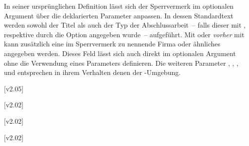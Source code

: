 \begin{DeclareEntity*}{}
\begin{DeclareEntity*}{}
\begin{DeclareEntity*}{}
\begin{Declaration}
\begin{Declaration}
\begin{Declaration}
\begin{Declaration}
\begin{Declaration}
\begin{Declaration}
\begin{Declaration}
In seiner ursprünglichen Definition lässt sich der Sperrvermerk im optionalen 
Argument über die deklarierten Parameter anpassen. In dessen Standardtext 
werden sowohl der Titel als auch der Typ der Abschlussarbeit~-- falls dieser 
mit , 
respektive durch die Option  angegeben wurde~-- aufgeführt. 
Mit  oder \emph{vorher} mit  kann 
zusätzlich eine im Sperrvermerk zu nennende Firma oder ähnliches angegeben 
werden. Dieses Feld lässt sich auch direkt im optionalen Argument ohne die 
Verwendung eines Parameters definieren. Die weiteren Parameter 
, 
, 
, 
 und 
 entsprechen in ihrem Verhalten denen 
der -Umgebung.
\end{Declaration}
\end{Declaration}
\end{Declaration}
\end{Declaration}
\end{Declaration}
\end{Declaration}
\end{Declaration}

\begin{Declaration}
  {}
\begin{Declaration}
  {}
  [v2.05]
\begin{Declaration}
  {}
\begin{Declaration}
  {}
  [v2.02]
\begin{Declaration}
  {}
  [v2.02]
\begin{Declaration}
  {}
  [v2.02]
\begin{Declaration}
  {}
\begin{Declaration}
  {}
\begin{Declaration}
  {}
\begin{Declaration}
  {}
\begin{Declaration}
  {}
\printdeclarationlist


\end{Declaration}
\end{Declaration}
\end{Declaration}
\end{Declaration}
\end{Declaration}
\end{Declaration}
\end{Declaration}
\end{Declaration}
\end{Declaration}
\end{Declaration}
\end{Declaration}
\end{DeclareEntity*}
\end{DeclareEntity*}
\end{DeclareEntity*}

